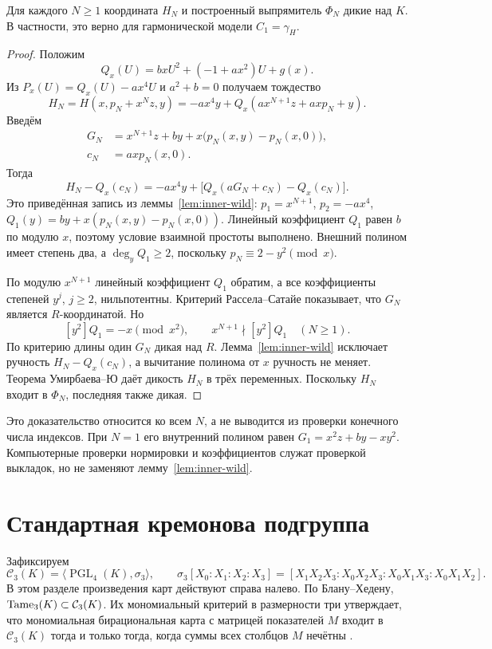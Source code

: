 \begin{proposition}
\label{prop:family-wild}
Для каждого $N\ge1$ координата $H_N$ и построенный выпрямитель
$\Phi_N$ дикие над $K$. В частности, это верно для гармонической
модели $C_1=\gamma_H$.
\end{proposition}
\begin{proof}
Положим
\[
 Q_x(U)=bxU^2+(-1+ax^2)U+g(x).
\]
Из $P_x(U)=Q_x(U)-ax^4U$ и $a^2+b=0$ получаем тождество
\[
 H_N=H(x,p_N+x^Nz,y)
     =-ax^4y+Q_x(ax^{N+1}z+axp_N+y).
\]
Введём
\[
 \begin{aligned}
 G_N&=x^{N+1}z+by+x\bigl(p_N(x,y)-p_N(x,0)\bigr),\\
 c_N&=axp_N(x,0).
 \end{aligned}
\]
Тогда
\begin{equation}\label{eq:family-reduced}
 H_N-Q_x(c_N)
 =-ax^4y+\bigl[Q_x(aG_N+c_N)-Q_x(c_N)\bigr].
\end{equation}
Это приведённая запись из леммы~\ref{lem:inner-wild}:
$p_1=x^{N+1}$, $p_2=-ax^4$,
$Q_1(y)=by+x(p_N(x,y)-p_N(x,0))$.
Линейный коэффициент $Q_1$ равен $b$ по модулю $x$, поэтому
условие взаимной простоты выполнено. Внешний полином имеет степень
два, а $\deg_yQ_1\ge2$, поскольку $p_N\equiv2-y^2\pmod x$.

По модулю $x^{N+1}$ линейный коэффициент $Q_1$ обратим, а все
коэффициенты степеней $y^j$, $j\ge2$, нильпотентны.
Критерий Рассела--Сатайе показывает, что $G_N$ является
$R$-координатой. Но
\[
 [y^2]Q_1=-x\pmod{x^2},\qquad
 x^{N+1}\nmid[y^2]Q_1\quad(N\ge1).
\]
По критерию длины один $G_N$ дикая над $R$.
Лемма~\ref{lem:inner-wild} исключает ручность
$H_N-Q_x(c_N)$, а вычитание полинома от $x$ ручность не меняет.
Теорема Умирбаева--Ю даёт дикость $H_N$ в трёх переменных.
Поскольку $H_N$ входит в $\Phi_N$, последняя также дикая.
\end{proof}

Это доказательство относится ко всем $N$, а не выводится из проверки
конечного числа индексов. При $N=1$ его внутренний полином равен
$G_1=x^2z+by-xy^2$. Компьютерные проверки нормировки и коэффициентов
служат проверкой выкладок, но не заменяют лемму~\ref{lem:inner-wild}.

\section{Стандартная кремонова подгруппа}\label{sec:standard-subgroup}

Зафиксируем
\[
 \mathcal C_3(K)=\langle\operatorname{PGL}_4(K),\sigma_3\rangle,
 \qquad
 \sigma_3[X_0:X_1:X_2:X_3]
 =[X_1X_2X_3:X_0X_2X_3:X_0X_1X_3:X_0X_1X_2].
\]
В этом разделе произведения карт действуют справа налево.
По Блану--Хедену, $\operatorname{Tame}_3(K)\subset\mathcal C_3(K)$.
Их мономиальный критерий в размерности три утверждает, что
мономиальная бирациональная карта с матрицей показателей $M$ входит
в $\mathcal C_3(K)$ тогда и только тогда, когда суммы всех столбцов
$M$ нечётны \cite[теорема~1.1 и предложение~6.5]{BH2015}.

